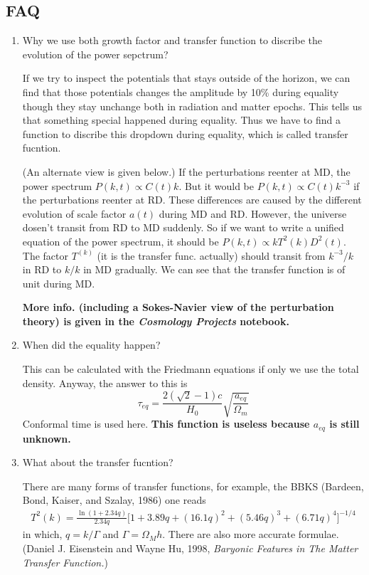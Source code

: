\documentclass{article}
\begin{document}
\subsection{FAQ}
\begin{enumerate}

\item Why we use both growth factor and transfer function to discribe the evolution of the power sepctrum?

If we try to inspect the potentials that stays outside of the horizon, we can find that those potentials changes the amplitude by 10\% during equality though they stay unchange both in radiation and matter epochs. This tells us that something special happened during equality. Thus we have to find a function to discribe this dropdown during equality, which is called transfer fucntion.

(An alternate view is given below.)
If the perturbations reenter at MD, the power spectrum $P(k,t)\propto C(t)k$. But it would be $P(k,t)\propto C(t)k^{-3}$ if the perturbations reenter at RD. These differences are caused by the different evolution of scale factor $a(t)$ during MD and RD. However, the universe dosen't transit from RD to MD suddenly. So if we want to write a unified equation of the power spectrum, it should be $P(k,t)\propto kT^2(k)D^2(t)$. The factor $T^(k)$ (it is the transfer func. actually) should transit from $k^{-3}/k$ in RD to $k/k$ in MD gradually. We can see that the transfer function is of unit during MD.

{\bf\color{red}More info. (including a Sokes-Navier view of the perturbation theory) is given in the {\it Cosmology Projects} notebook.}

\item When did the equality happen?

This can be calculated with the Friedmann equations if only we use the total density. Anyway, the answer to this is
\begin{equation}
\tau_{eq}=\frac{2(\sqrt 2 -1)c}{H_0}\sqrt{\frac{a_{eq}}{\Omega_m}}
\end{equation}
Conformal time is used here.{\bf\color{red} This function is useless because $a_{eq}$ is still unknown. }

\item
What about the transfer fucntion?

There are many forms of transfer functions, for example, the BBKS (Bardeen, Bond, Kaiser, and Szalay, 1986) one reads
\begin{eqnarray}
T^2(k)=\frac{\ln{(1+2.34q)}}{2.34q}\bigg[ 1+3.89q+(16.1q)^2+(5.46q)^3+(6.71q)^4 \bigg]^{-1/4}
\end{eqnarray}
in which, $q=k/\Gamma$ and $\Gamma=\Omega_Mh$.
There are also more accurate formulae. (Daniel J. Eisenstein and Wayne Hu, 1998, {\it Baryonic Features in The Matter Transfer Function.})


\end{enumerate}
\end{document}
